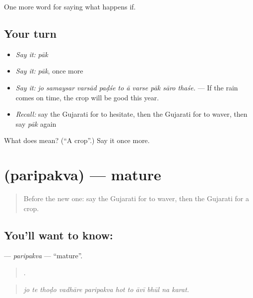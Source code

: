 \begin{grammarlens}[title={What you've built}]
One more word for saying what happens if.
\end{grammarlens}

\subsection*{Your turn}
\begin{itemize}
\raggedright
  \item \emph{Say it:} \emph{pāk}
  \item \emph{Say it:} \emph{pāk}, once more
  \item \emph{Say it:} \emph{jo samaysar varsād paḍśe to ā varse pāk sāro thaśe.} — If the rain comes on time, the crop will be good this year.
  \item \emph{Recall:} say the Gujarati for to hesitate, then the Gujarati for to waver, then say \emph{pāk} again
\end{itemize}

\begin{tcolorbox}[breakable,colback=teal!4,colframe=teal!35!black,title={Before you move on}]
What does  mean? (\textquotedblleft{}A crop\textquotedblright{}.) Say it once more.
\end{tcolorbox}
\section[\texorpdfstring{\gu{પરિપક્વ} (paripakva)}{પરિપક્વ (paripakva)}]{ (paripakva) — mature}

\label{lesson:GU-C390-paripakva}



\begin{quote}
Before the new one: say the Gujarati for to waver, then the Gujarati for a crop.
\end{quote}

\subsection*{You'll want to know: }
\textbf{} — \emph{paripakva} — \textquotedblleft{}mature\textquotedblright{}.

\begin{quote}
          .
\end{quote}

\begin{quote}
\emph{jo te thoḍo vadhāre paripakva hot to āvī bhūl na karat.}
\end{quote}

